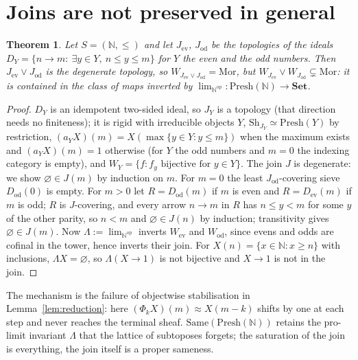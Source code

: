 \documentclass[11pt]{amsart}
\newtheorem{thm}{Theorem}[section]
\theoremstyle{definition}
\newcommand{\Same}{\mathrm{Same}}
\newcommand{\Mor}{\mathrm{Mor}}
\newcommand{\Presh}{\mathrm{Presh}}
\newcommand{\Sh}{\mathrm{Sh}}
\begin{document}
\section{Joins are not preserved in general}\label{sec:N}

\begin{thm}\label{thm:N}
Let $S=(\mathbb N,\le)$ and let $J_{\mathrm{ev}}$, $J_{\mathrm{od}}$ be the
topologies of the ideals $D_Y=\{n\to m:\ \exists y\in Y,\ n\le y\le m\}$ for
$Y$ the even and the odd numbers. Then $J_{\mathrm{ev}}\vee J_{\mathrm{od}}$ is
the degenerate topology, so $W_{J_{\mathrm{ev}}\vee J_{\mathrm{od}}}=\Mor$, but
$W_{J_{\mathrm{ev}}}\vee W_{J_{\mathrm{od}}}\subsetneq\Mor$: it is contained in
the class of maps inverted by $\lim_{\mathbb N^{\mathrm{op}}}\colon\Presh(\mathbb N)\to\mathbf{Set}$.
\end{thm}
\begin{proof}
$D_Y$ is an idempotent two-sided ideal, so $J_Y$ is a topology
\cite[Thm.~5.1]{Postnikov} (that direction needs no finiteness); it is rigid
with irreducible objects $Y$, $\Sh_{J_Y}\simeq\Presh(Y)$ by restriction,
$(a_YX)(m)=X(\max\{y\in Y:y\le m\})$ when the maximum exists and
$(a_YX)(m)=1$ otherwise (for $Y$ the odd numbers and $m=0$ the indexing
category is empty), and $W_Y=\{f:f_y\text{ bijective for }y\in Y\}$.
The join $J$ is degenerate: we show $\varnothing\in J(m)$ by induction on
$m$. For $m=0$ the least $J_{\mathrm{od}}$-covering sieve $D_{\mathrm{od}}(0)$ is
empty. For $m>0$ let $R=D_{\mathrm{od}}(m)$ if $m$ is even and $R=D_{\mathrm{ev}}(m)$
if $m$ is odd; $R$ is $J$-covering, and every arrow $n\to m$ in $R$ has
$n\le y<m$ for some $y$ of the other parity, so $n<m$ and $\varnothing\in J(n)$
by induction; transitivity gives $\varnothing\in J(m)$. Now $\Lambda:=\lim_{\mathbb N^{\mathrm{op}}}$ inverts
$W_{\mathrm{ev}}$ and $W_{\mathrm{od}}$, since evens and odds are cofinal in the
tower, hence inverts their join. For $X(n)=\{x\in\mathbb N:x\ge n\}$ with
inclusions, $\Lambda X=\varnothing$, so $\Lambda(X\to1)$ is not bijective and
$X\to1$ is not in the join.
\end{proof}

The mechanism is the failure of objectwise stabilisation in
Lemma~\ref{lem:reduction}: here $(\Phi_kX)(m)\approx X(m-k)$ shifts by one at
each step and never reaches the terminal sheaf. $\Same(\Presh(\mathbb N))$
retains the pro-limit invariant $\Lambda$ that the lattice of subtoposes
forgets; the saturation of the join is everything, the join itself is a
proper sameness.
\end{document}
